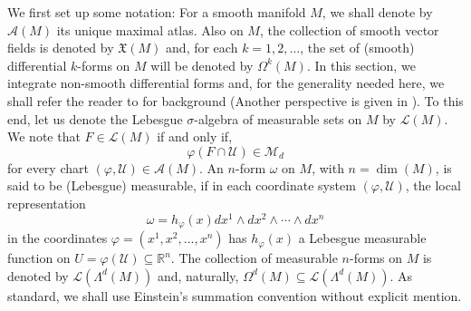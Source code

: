 \documentclass[11pt]{article}
\theoremstyle{remark}
\begin{document}
\noindent We first set up some notation: For a smooth manifold $M$, we shall denote by $\mathcal{A}(M)$ its unique maximal atlas. Also on $M$, the collection of smooth vector fields is denoted by $\mathfrak{X}(M)$ and, for each $k=1,2,\dots$, the set of (smooth) differential $k$-forms on $M$ will be denoted by $\Omega^k(M)$.  In this section, we integrate non-smooth differential forms and, for the generality needed here, we shall refer the reader to \cite{naber_topology_2011} for background (Another perspective is given in \cite{amann_analysis_2009}). To this end, let us denote the Lebesgue $\sigma$-algebra of measurable sets on $M$ by $\mathcal{L}(M)$. We note that $F\in\mathcal{L}(M)$ if and only if, \begin{equation*}
    \varphi(F\cap \mathcal{U})\in\mathcal{M}_d
\end{equation*}
for every chart $(\varphi,\mathcal{U})\in\mathcal{A}(M)$. An $n$-form $\omega$ on $M$, with $n=\dim(M)$, is said to be (Lebesgue) measurable, if in each coordinate system $(\varphi,\mathcal{U})$, the local representation
\begin{equation*}
    \omega=h_{\varphi}(x)dx^1\wedge dx^2\wedge \cdots\wedge dx^n
\end{equation*}
in the coordinates $\varphi=(x^1,x^2,\dots,x^n)$ has $h_{\varphi}(x)$ a Lebesgue measurable function on $U=\varphi(\mathcal{U})\subseteq\mathbb{R}^n$. The collection of measurable $n$-forms on $M$ is denoted by $\mathcal{L}(\Lambda^d(M))$ and, naturally, $\Omega^{d}(M)\subseteq \mathcal{L}(\Lambda^d(M))$. As standard, we shall use Einstein's summation convention without explicit mention.\\
\end{document}
